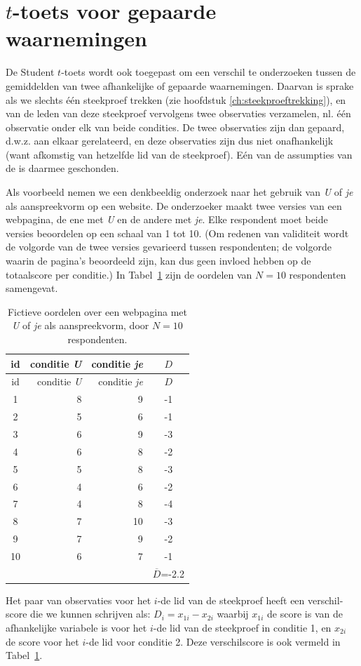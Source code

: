 \documentclass[
]{book}
\begin{document}
\hypertarget{sec:ttoets-gepaard}{%
\section{\texorpdfstring{\(t\)-toets voor gepaarde waarnemingen}{t-toets voor gepaarde waarnemingen}}\label{sec:ttoets-gepaard}}

De Student \(t\)-toets wordt ook toegepast om een verschil te onderzoeken tussen de
gemiddelden van twee afhankelijke of gepaarde waarnemingen. Daarvan is
sprake als we slechts één steekproef trekken (zie hoofdstuk
\ref{ch:steekproeftrekking}), en van de leden van deze steekproef
vervolgens twee observaties verzamelen, nl. één observatie onder elk van
beide condities. De twee observaties zijn dan gepaard, d.w.z. aan elkaar
gerelateerd, en deze observaties zijn dus niet onafhankelijk (want
afkomstig van hetzelfde lid van de steekproef). Eén van de assumpties
van de is daarmee geschonden.

Als voorbeeld nemen we een denkbeeldig onderzoek naar het gebruik van
\emph{U} of \emph{je} als aanspreekvorm op een website. De onderzoeker maakt twee
versies van een webpagina, de ene met \emph{U} en de andere met \emph{je}. Elke
respondent moet beide versies beoordelen op een schaal van 1 tot 10. (Om
redenen van validiteit wordt de volgorde van de twee versies gevarieerd
tussen respondenten; de volgorde waarin de pagina's beoordeeld zijn, kan
dus geen invloed hebben op de totaalscore per conditie.) In
Tabel~\ref{tab:data-uje-paired} zijn de oordelen van \(N=10\)
respondenten samengevat.

\begin{longtable}[]{@{}crrc@{}}
\caption{\label{tab:data-uje-paired} Fictieve oordelen over een webpagina met \emph{U} of \emph{je} als
aanspreekvorm, door \(N=10\) respondenten.}\tabularnewline
\toprule
id & conditie \emph{U} & conditie \emph{je} & \(D\)\tabularnewline
\midrule
\endfirsthead
\toprule
id & conditie \emph{U} & conditie \emph{je} & \(D\)\tabularnewline
\midrule
\endhead
1 & 8 & 9 & -1\tabularnewline
2 & 5 & 6 & -1\tabularnewline
3 & 6 & 9 & -3\tabularnewline
4 & 6 & 8 & -2\tabularnewline
5 & 5 & 8 & -3\tabularnewline
6 & 4 & 6 & -2\tabularnewline
7 & 4 & 8 & -4\tabularnewline
8 & 7 & 10 & -3\tabularnewline
9 & 7 & 9 & -2\tabularnewline
10 & 6 & 7 & -1\tabularnewline
& & & \(\overline{D}\)=-2.2\tabularnewline
\bottomrule
\end{longtable}

Het paar van observaties voor het \(i\)-de lid van de steekproef heeft een
verschil-score die we kunnen schrijven als:
\(D_i = x_{1i} - x_{2i}\) waarbij \(x_{1i}\) de score is van de afhankelijke
variabele is voor het \(i\)-de lid van de steekproef in conditie 1, en
\(x_{2i}\) de score voor het \(i\)-de lid voor conditie 2. Deze
verschilscore is ook vermeld in
Tabel~\ref{tab:data-uje-paired}.
\end{document}

